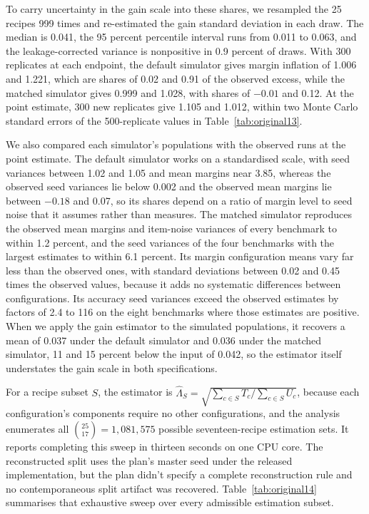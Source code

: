 To carry uncertainty in the gain scale into these shares, we resampled the 25 recipes 999 times and re-estimated the gain standard deviation in each draw. The median is 0.041, the 95 percent percentile interval runs from 0.011 to 0.063, and the leakage-corrected variance is nonpositive in 0.9 percent of draws. With 300 replicates at each endpoint, the default simulator gives margin inflation of 1.006 and 1.221, which are shares of 0.02 and 0.91 of the observed excess, while the matched simulator gives 0.999 and 1.028, with shares of $-0.01$ and 0.12. At the point estimate, 300 new replicates give 1.105 and 1.012, within two Monte Carlo standard errors of the 500-replicate values in Table~\ref{tab:original13}.

We also compared each simulator's populations with the observed runs at the point estimate. The default simulator works on a standardised scale, with seed variances between 1.02 and 1.05 and mean margins near 3.85, whereas the observed seed variances lie below 0.002 and the observed mean margins lie between $-0.18$ and 0.07, so its shares depend on a ratio of margin level to seed noise that it assumes rather than measures. The matched simulator reproduces the observed mean margins and item-noise variances of every benchmark to within 1.2 percent, and the seed variances of the four benchmarks with the largest estimates to within 6.1 percent. Its margin configuration means vary far less than the observed ones, with standard deviations between 0.02 and 0.45 times the observed values, because it adds no systematic differences between configurations. Its accuracy seed variances exceed the observed estimates by factors of 2.4 to 116 on the eight benchmarks where those estimates are positive. When we apply the gain estimator to the simulated populations, it recovers a mean of 0.037 under the default simulator and 0.036 under the matched simulator, 11 and 15 percent below the input of 0.042, so the estimator itself understates the gain scale in both specifications.

For a recipe subset $S$, the estimator is $\widehat\Lambda_S=\sqrt{\sum_{c\in S}T_c/\sum_{c\in S}U_c}$, because each configuration's components require no other configurations, and the analysis enumerates all $\binom{25}{17}=1{,}081{,}575$ possible seventeen-recipe estimation sets. It reports completing this sweep in thirteen seconds on one CPU core. The reconstructed split uses the plan's master seed under the released implementation, but the plan didn't specify a complete reconstruction rule and no contemporaneous split artifact was recovered. Table~\ref{tab:original14} summarises that exhaustive sweep over every admissible estimation subset.

